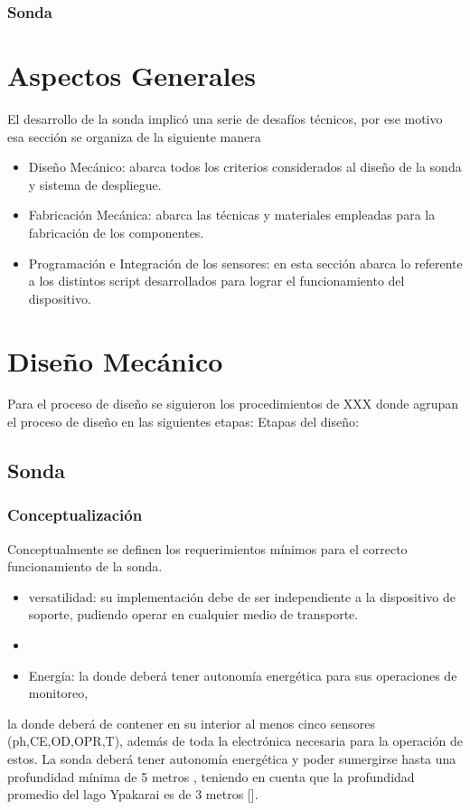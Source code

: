 \subsubsection{Sonda}








\section{Aspectos Generales}
El desarrollo de la sonda implic\'o una serie de desaf\'ios t\'ecnicos, por ese motivo esa secci\'on se organiza de la siguiente manera

\begin{itemize}
    \item Dise\~no Mec\'anico: abarca todos los criterios considerados al dise\~no de la sonda y sistema de despliegue. 
    \item Fabricaci\'on Mec\'anica: abarca las t\'ecnicas y materiales empleadas para la fabricaci\'on de los componentes.
    \item Programaci\'on e Integraci\'on de los sensores: en esta secci\'on abarca lo referente a los distintos script desarrollados para lograr el funcionamiento del dispositivo.
\end{itemize}
\section{Dise\~no Mec\'anico}
Para el proceso de dise\~no se siguieron los procedimientos de XXX donde agrupan el proceso de dise\~no en las siguientes etapas:
Etapas del dise\~no: 

\subsection{Sonda}
\subsubsection{Conceptualizaci\'on}
Conceptualmente se definen los requerimientos m\'inimos para el correcto funcionamiento de la sonda.
\begin{itemize}
    \item versatilidad: su implementación debe de ser independiente a la dispositivo de soporte, pudiendo operar en cualquier medio de transporte.
    \item 
    \item Energ\'ia: la donde deber\'a tener autonom\'ia energ\'etica para sus operaciones de monitoreo,  
\end{itemize}
la donde deberá de contener en su interior al menos cinco sensores  (ph,CE,OD,OPR,T), adem\'as de toda la electr\'onica necesaria para la operaci\'on de estos. La sonda deber\'a tener autonom\'ia energ\'etica y poder sumergirse hasta una profundidad m\'inima de 5 metros , teniendo en cuenta que la profundidad promedio del lago Ypakarai es de 3 metros [\cite{hidrologiaItaipu}].
   
